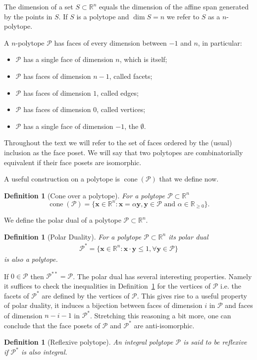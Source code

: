 \documentclass[a4paper,11pt,reqno]{amsart}
\newcommand{\R}{\mathbb R}
\newcommand{\Pp}{{\mathcal P}}
\DeclareMathOperator{\cone}{cone}
\newtheorem{definition}[theorem]{Definition}
\begin{document}
The dimension of a set $S \subset \mathbb{R}^n$ equals the dimension of the affine span generated by the points in $S$. 
If $S$ is a polytope and $\dim S=n$ we refer to $S$ as a $n$-polytope.

A $n$-polytope $\Pp$ has faces of every dimension between $-1$ and $n$, in particular:
\begin{itemize}
    \item $\mathcal{P}$ has a single face of dimension $n$, which is itself;
    \item $\mathcal{P}$ has faces of dimension $n-1$, called facets;
    \item $\mathcal{P}$ has faces of dimension $1$, called edges;
    \item $\mathcal{P}$ has faces of dimension $0$, called vertices;
    \item $\mathcal{P}$ has a single face of dimension $-1$, the $\emptyset$.
\end{itemize}
Throughout the text we will refer to the set of faces ordered by the (usual) inclusion as the face poset. 
We will say that two polytopes are combinatorially equivalent if their face posets are isomorphic.

A useful construction on a polytope is $\cone(\mathcal{P})$ that we define now.
\begin{definition}[Cone over a polytope]
For a polytope $\mathcal{P} \subset\R^n$
\[
\cone(\mathcal{P})=\{\bm{x} \in \mathbb{R}^n : \bm{x}=\alpha \bm{y}, \bm{y} \in \mathcal{P} \text{ and } \alpha \in \mathbb{R}_{\geq 0} \}.
\]	
\end{definition}

We define the polar dual of a polytope $\mathcal{P} \subset \mathbb{R}^n$.
\begin{definition}[Polar Duality]\label{def:polar}
For a polytope $\mathcal{P} \subset \mathbb{R}^n$ its polar dual
\begin{align*}
\mathcal{P}^*=\{ \bm{x} \in \mathbb{R}^n : \bm{x} \cdot \bm{y} \leq 1,  \forall \bm{y} \in \mathcal{P} \}
\end{align*}
is also a polytope.	
\end{definition}
\noindent If $0 \in \mathcal{P}$ then $\mathcal{P}^{**}=\mathcal{P}$. The polar dual has several interesting properties. 
Namely it suffices to check the inequalities in Definition~\ref{def:polar} for the vertices of $\mathcal{P}$ i.e. the facets of $\mathcal{P}^*$ 
are defined by the vertices of $\mathcal{P}$. This gives rise to a useful property of polar duality, it induces a bijection between 
faces of dimension $i$ in $\mathcal{P}$ and faces of dimension $n-i-1$ in $\mathcal{P}^*$. Stretching this reasoning a bit more, 
one can conclude that the face posets of $\mathcal{P}$ and $\mathcal{P}^*$ are anti-isomorphic.
\begin{definition}[Reflexive polytope]\label{def:reflexive}
An integral polytope $\mathcal{P}$ is said to be reflexive if $\mathcal{P}^*$ is also integral.
\end{definition}
\end{document}
